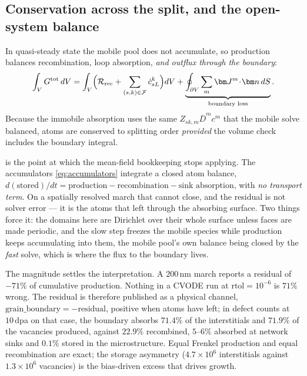 \documentclass{article}
\begin{document}
\subsection{Conservation across the split, and the open-system balance}
\label{sec:conservation}

In quasi-steady state the mobile pool does not accumulate, so production balances
recombination, loop absorption, \emph{and outflux through the boundary}:
\begin{equation}
  \int_{V}G^{\mathrm{tot}}\,dV
  =\int_{V}\Bigl(\mathcal R_{\mathrm{rec}}
     +\sum_{(s,k)\in\mathcal F}\dot c^{k}_{sL}\Bigr)dV
  +\underbrace{\oint_{\partial V}\sum_m\bm J^m\!\cdot\!\bm n\,dS}
              _{\text{boundary loss}}.
  \label{eq:cons_split}
\end{equation}
Because the immobile absorption uses the same $Z_{sk,m}\overline{D}^m c^m$ that
the mobile solve balanced, atoms are conserved to splitting order \emph{provided}
the volume check includes the boundary integral.

 is the point at which the mean-field bookkeeping stops
applying. The accumulators \cref{eq:accumulators} integrate a closed atom
balance, $d(\text{stored})/dt=\text{production}-\text{recombination}-
\text{sink absorption}$, with \emph{no transport term}. On a spatially resolved
march that cannot close, and the residual is not solver error --- it is the atoms
that left through the absorbing surface. Two things force it: the domains here
are Dirichlet over their whole surface unless faces are made periodic, and the
slow step freezes the mobile species while production keeps accumulating into
them, the mobile pool's own balance being closed by the \emph{fast} solve, which
is where the flux to the boundary lives.

The magnitude settles the interpretation. A $200\,$nm march reports a residual of
$-71\%$ of cumulative production. Nothing in a CVODE run at
$\mathrm{rtol}=10^{-6}$ is $71\%$ wrong. The residual is therefore published as a
physical channel, $\text{grain\_boundary}=-\text{residual}$, positive when atoms
have left; in defect counts at $10\,$dpa on that case, the boundary absorbs
$71.4\%$ of the interstitials and $71.9\%$ of the vacancies produced, against
$22.9\%$ recombined, $5$--$6\%$ absorbed at network sinks and $0.1\%$ stored in
the microstructure. Equal Frenkel production and equal recombination are exact;
the storage asymmetry ($4.7\times10^{6}$ interstitials against $1.3\times10^{6}$
vacancies) is the bias-driven excess that drives growth.
\end{document}
